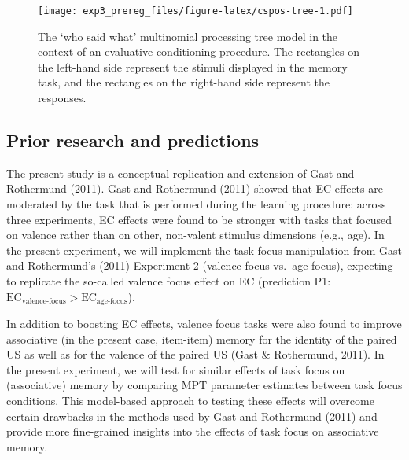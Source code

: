 \documentclass[
  doc,floatsintext]{apa6}
\begin{document}
\begin{figure}
\centering
\texttt{[image: exp3\_prereg\_files/figure-latex/cspos-tree-1.pdf]}
\caption{\label{fig:cspos-tree}The `who said what' multinomial processing tree model in the context of an evaluative conditioning procedure. The rectangles on the left-hand side represent the stimuli displayed in the memory task, and the rectangles on the right-hand side represent the responses.}
\end{figure}

\hypertarget{prior-research-and-predictions}{%
\subsection{Prior research and predictions}\label{prior-research-and-predictions}}

The present study is a conceptual replication and extension of Gast and Rothermund (2011).
Gast and Rothermund (2011) showed that EC effects are moderated by the task that is performed during the learning procedure: across three experiments, EC effects were found to be stronger with tasks that focused on valence rather than on other, non-valent stimulus dimensions (e.g., age).
In the present experiment, we will implement the task focus manipulation from Gast and Rothermund's (2011) Experiment 2 (valence focus vs.~age focus), expecting to replicate the so-called valence focus effect on EC (prediction P1: \(\textrm{EC}_\textrm{valence-focus}>\textrm{EC}_\textrm{age-focus}\)).

In addition to boosting EC effects, valence focus tasks were also found to improve associative (in the present case, item-item) memory for the identity of the paired US as well as for the valence of the paired US (Gast \& Rothermund, 2011).
In the present experiment, we will test for similar effects of task focus on (associative) memory by comparing MPT parameter estimates between task focus conditions.
This model-based approach to testing these effects will overcome certain drawbacks in the methods used by Gast and Rothermund (2011) and provide more fine-grained insights into the effects of task focus on associative memory.
\end{document}
